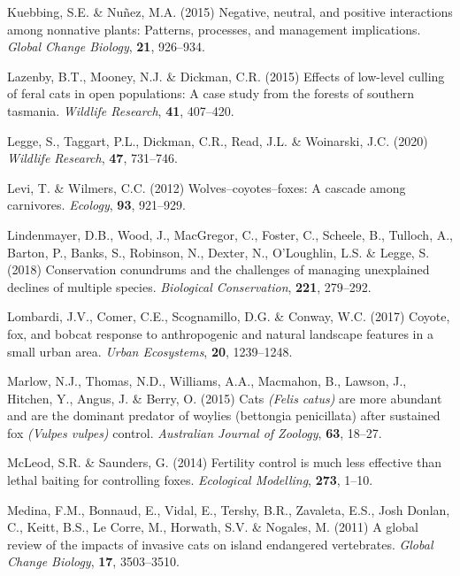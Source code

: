 \documentclass[]{elsarticle} %
\begin{document}
\leavevmode\hypertarget{ref-kuebbing2015negative}{}%
Kuebbing, S.E. \& Nuñez, M.A. (2015) Negative, neutral, and positive interactions among nonnative plants: Patterns, processes, and management implications. \emph{Global Change Biology}, \textbf{21}, 926--934.

\leavevmode\hypertarget{ref-lazenby2015effects}{}%
Lazenby, B.T., Mooney, N.J. \& Dickman, C.R. (2015) Effects of low-level culling of feral cats in open populations: A case study from the forests of southern tasmania. \emph{Wildlife Research}, \textbf{41}, 407--420.

\leavevmode\hypertarget{ref-legge2020cat}{}%
Legge, S., Taggart, P.L., Dickman, C.R., Read, J.L. \& Woinarski, J.C. (2020) \emph{Wildlife Research}, \textbf{47}, 731--746.

\leavevmode\hypertarget{ref-levi2012wolves}{}%
Levi, T. \& Wilmers, C.C. (2012) Wolves--coyotes--foxes: A cascade among carnivores. \emph{Ecology}, \textbf{93}, 921--929.

\leavevmode\hypertarget{ref-lindenmayer2018conservation}{}%
Lindenmayer, D.B., Wood, J., MacGregor, C., Foster, C., Scheele, B., Tulloch, A., Barton, P., Banks, S., Robinson, N., Dexter, N., O'Loughlin, L.S. \& Legge, S. (2018) Conservation conundrums and the challenges of managing unexplained declines of multiple species. \emph{Biological Conservation}, \textbf{221}, 279--292.

\leavevmode\hypertarget{ref-lombardi2017coyote}{}%
Lombardi, J.V., Comer, C.E., Scognamillo, D.G. \& Conway, W.C. (2017) Coyote, fox, and bobcat response to anthropogenic and natural landscape features in a small urban area. \emph{Urban Ecosystems}, \textbf{20}, 1239--1248.

\leavevmode\hypertarget{ref-marlow2015cats}{}%
Marlow, N.J., Thomas, N.D., Williams, A.A., Macmahon, B., Lawson, J., Hitchen, Y., Angus, J. \& Berry, O. (2015) Cats \emph{(Felis catus)} are more abundant and are the dominant predator of woylies (bettongia penicillata) after sustained fox \emph{(Vulpes vulpes)} control. \emph{Australian Journal of Zoology}, \textbf{63}, 18--27.

\leavevmode\hypertarget{ref-mcleod2014fertility}{}%
McLeod, S.R. \& Saunders, G. (2014) Fertility control is much less effective than lethal baiting for controlling foxes. \emph{Ecological Modelling}, \textbf{273}, 1--10.

\leavevmode\hypertarget{ref-medina2011global}{}%
Medina, F.M., Bonnaud, E., Vidal, E., Tershy, B.R., Zavaleta, E.S., Josh Donlan, C., Keitt, B.S., Le Corre, M., Horwath, S.V. \& Nogales, M. (2011) A global review of the impacts of invasive cats on island endangered vertebrates. \emph{Global Change Biology}, \textbf{17}, 3503--3510.
\end{document}
